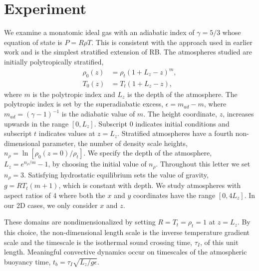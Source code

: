 \documentclass[aps, prl, twocolumn, nofootinbib, groupedaddress, amsfonts, amssymb, amsmath]{revtex4-1}
\begin{document}
\section{Experiment} 
\label{sec:experiment}
We examine a monatomic ideal gas with an adiabatic index of
$\gamma = 5/3$ whose equation of state is $P = R\rho T$. This is consistent with the approach used in earlier work 
\cite{graham1975, chan&all1982, brandenburg&all2005,
hurlburt&all1984, cattaneo&all1990, cattaneo&all1991, brummell&all1996} 
and is the simplest stratified extension of RB.
The atmospheres studied are initially polytropically stratified,
\begin{equation}
\begin{split}
\rho_0(z) &= \rho_{t}(1 + L_z - z)^m, \\
T_0(z)    &= T_{t}(1 + L_z - z),
\label{eqn:polytrope}
\end{split}
\end{equation}
where $m$ is the polytropic index and $L_z$ is the depth of the atmosphere.
The polytropic
index is set by the superadiabatic excess, $\epsilon = m_{ad} - m$, where
$m_{ad} = (\gamma - 1)^{-1}$ is the adiabatic value of $m$.
The height coordinate, $z$, increases upwards in the range $[0, L_z]$.
Subscript 0 indicates initial conditions and subscript $t$ indicates values
at $z = L_z$.   Stratified atmospheres have a fourth non-dimensional parameter,
the number of density scale heights, $n_{\rho} = \ln\left[\rho_0(z=0)/\rho_t\right]$.  We
specify the depth of the atmosphere, $L_z = e^{n_{\rho}/m} - 1$, by choosing
the initial value of $n_{\rho}$.
Throughout this letter we set $n_{\rho} = 3$.    Satisfying hydrostatic
equilibrium sets the value of gravity, $g = RT_t (m + 1)$, which is
constant with depth.  We study atmospheres with aspect
ratios of 4 where both the $x$ and $y$ coordinates have the range $[0, 4L_z]$.
In our 2D cases, we only consider $x$ and $z$.

These domains are nondimensionalized by setting
$R = T_t = \rho_t = 1$ at $z = L_z$.
By this choice, the non-dimensional
length scale is the inverse temperature gradient scale and the 
timescale is the isothermal sound crossing time, 
$\tau_I$, of this unit length.
Meaningful convective dynamics occur on 
timescales of the atmospheric buoyancy time,
$t_b = \tau_I \sqrt{L_z/g\epsilon}$. 
\end{document}
